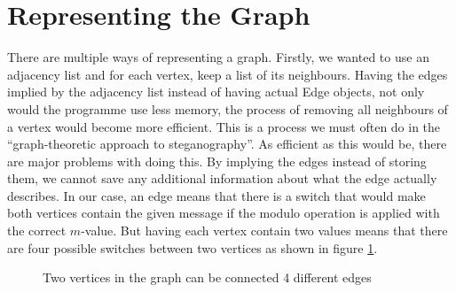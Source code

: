 \section{Representing the Graph}
There are multiple ways of representing a graph. 
Firstly, we wanted to use an adjacency list and for each vertex, keep a list of its neighbours. 
Having the edges implied by the adjacency list instead of having actual Edge objects, not only would the programme use less memory, the process of removing all neighbours of a vertex would become more efficient. This is a process we must often do in the ``graph-theoretic approach to steganography''. 
As efficient as this would be, there are major problems with doing this. 
By implying the edges instead of storing them, we cannot save any additional information about what the edge actually describes. 
In our case, an edge means that there is a switch that would make both vertices contain the given message if the modulo operation is applied with the correct $m$-value. 
But having each vertex contain two values means that there are four possible switches between two vertices as shown in figure \ref{fig:graphSwitches}.

\begin{figure}
\begin {center}
\end{center}
\caption{Two vertices in the graph can be connected 4 different edges}
\label{fig:graphSwitches}
\end{figure}

